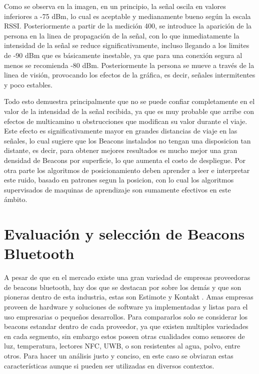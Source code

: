 Como se observa en la imagen, en un principio, la señal oscila en valores inferiores a -75 dBm, lo cual es aceptable y medianamente bueno según la escala RSSI. Posteriormente a partir de la medición 400, se introduce la aparición de la persona en la linea de propagación de la señal, con lo que inmediatamente la intensidad de la señal se reduce significativamente, incluso llegando a los limites de -90 dBm que es básicamente inestable, ya que para una conexión segura al menos se recomienda -80 dBm. Posteriormente la persona se mueve a través de la linea de visión, provocando los efectos de la gráfica, es decir, señales intermitentes y poco estables.

Todo esto demuestra principalmente que no se puede confiar completamente en el valor de la intensidad de la señal recibida, ya que es muy probable que arribe con efectos de multicamino u obstrucciones que modifican su valor durante el viaje. Este efecto es significativamente mayor en grandes distancias de viaje en las señales, lo cual sugiere que los Beacons instalados no tengan una disposicion tan distante, es decir, para obtener mejores resultados es mucho mejor una gran densidad de Beacons por superficie, lo que aumenta el costo de despliegue. Por otra parte los algoritmos de posicionamiento deben aprender a leer e interpretar este ruido, basado en patrones segun la posicion, con lo cual los algoritmos supervisados de maquinas de aprendizaje son sumamente efectivos en este ámbito.

\section{Evaluación y selección de Beacons Bluetooth}
\label{sec:seleccion}

A pesar de que en el mercado existe una gran variedad de empresas proveedoras de beacons bluetooth, hay dos que se destacan por sobre los demás y que son pioneras dentro de esta industria, estas son Estimote \citep{estimote} y Kontakt \citep{kontaktio}. Amas empresas proveen de hardware y soluciones de software ya implementadas y listas para el uso empresarias o pequeños desarrollos. Para compararlos solo se considerar los beacons estandar dentro de cada proveedor, ya que existen multiples variedades en cada segmento, sin embargo estos poseen otras cualidades como sensores de luz, temperatura, lectores NFC, UWB, o son resistentes al agua, polvo, entre otros. Para hacer un análisis justo y conciso, en este caso se obviaran estas características aunque si pueden ser utilizadas en diversos contextos. 

